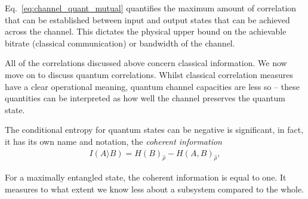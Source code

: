Eq.~\eqref{eq:channel_quant_mutual} quantifies the maximum amount of correlation that can be established between input and output states that can be achieved across the channel. This dictates the physical upper bound on the achievable bitrate (classical communication) or bandwidth of the channel.


\vspace{5mm}
All of the correlations discussed above concern classical information.
We now move on to discuss quantum correlations. Whilst classical correlation measures have a clear operational meaning, quantum channel capacities are less so -- these quantities can be interpreted as how well the channel preserves the quantum state.

The conditional entropy for quantum states can be negative is significant, in fact, it has its own name and notation, the \textit{coherent information}
\begin{align}
I(A\rangle B) = H(B)_{\hat\rho} - H(A,B)_{\hat\rho},
\end{align}

\noindent For a maximally entangled state, the coherent information is equal to one. It measures to what extent we know less about a subsystem compared to the whole.




